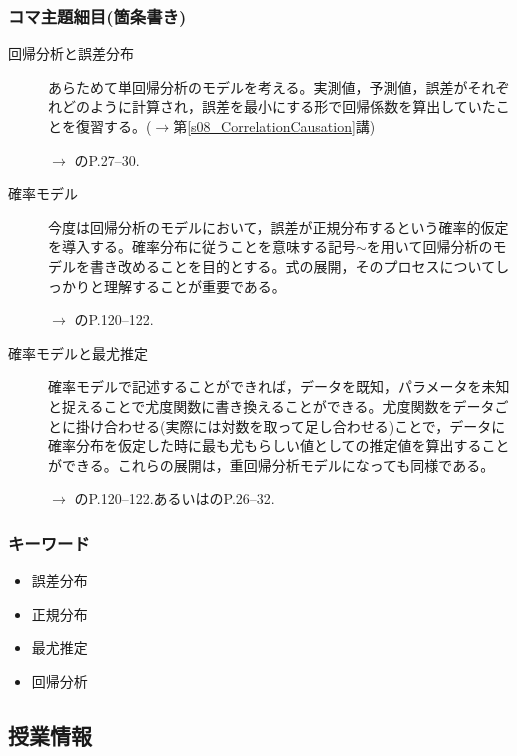 \subsubsection{コマ主題細目(箇条書き)}
\begin{description}

	\item[回帰分析と誤差分布]あらためて単回帰分析のモデルを考える。実測値，予測値，誤差がそれぞれどのように計算され，誤差を最小にする形で回帰係数を算出していたことを復習する。($\to$第\ref{s08_CorrelationCausation}講)
	      \begin{flushright}
		      $\to$ \textcite{Toyoda201706}のP.27--30.
	      \end{flushright}

	\item[確率モデル]今度は回帰分析のモデルにおいて，誤差が正規分布するという確率的仮定を導入する。確率分布に従うことを意味する記号$\sim$を用いて回帰分析のモデルを書き改めることを目的とする。式の展開，そのプロセスについてしっかりと理解することが重要である。
	      \begin{flushright}
		      $\to$ \textcite{kosugi2018}のP.120--122.
	      \end{flushright}

	\item[確率モデルと最尤推定]確率モデルで記述することができれば，データを既知，パラメータを未知と捉えることで尤度関数に書き換えることができる。尤度関数をデータごとに掛け合わせる(実際には対数を取って足し合わせる)ことで，データに確率分布を仮定した時に最も尤もらしい値としての推定値を算出することができる。これらの展開は，重回帰分析モデルになっても同様である。
	      \begin{flushright}
		      $\to$ \textcite{kosugi2018}のP.120--122.あるいは\textcite{Hamada201912}のP.26--32.
	      \end{flushright}

\end{description}
\subsubsection{キーワード}
\begin{itemize}
	\item 誤差分布
	\item 正規分布
	\item 最尤推定
	\item 回帰分析
\end{itemize}
\subsection{授業情報}
